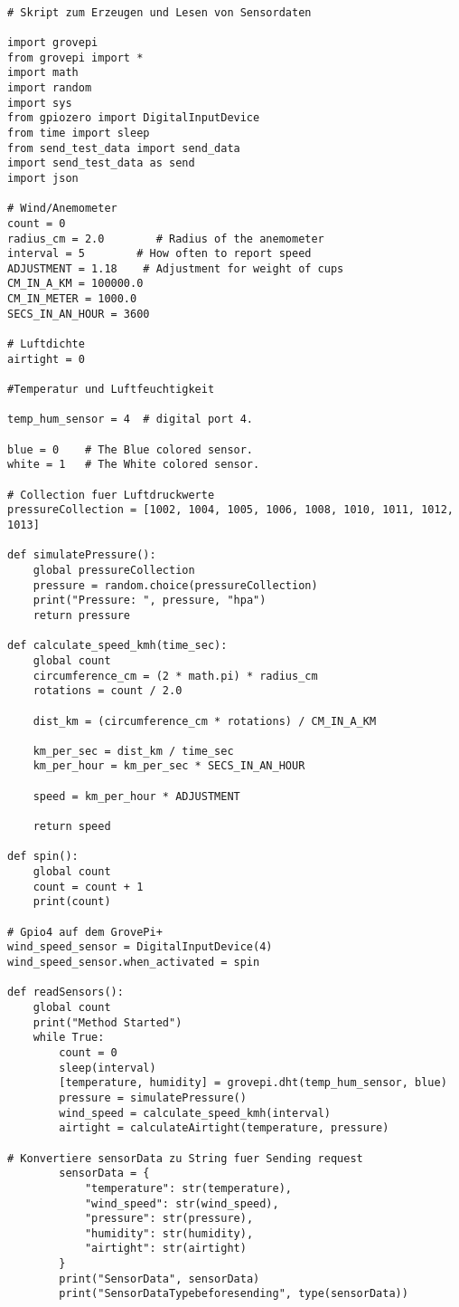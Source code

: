 \begin{lstlisting}

# Skript zum Erzeugen und Lesen von Sensordaten

import grovepi
from grovepi import *
import math
import random
import sys
from gpiozero import DigitalInputDevice
from time import sleep
from send_test_data import send_data
import send_test_data as send
import json

# Wind/Anemometer
count = 0
radius_cm = 2.0        # Radius of the anemometer
interval = 5        # How often to report speed
ADJUSTMENT = 1.18    # Adjustment for weight of cups
CM_IN_A_KM = 100000.0
CM_IN_METER = 1000.0
SECS_IN_AN_HOUR = 3600

# Luftdichte
airtight = 0

#Temperatur und Luftfeuchtigkeit

temp_hum_sensor = 4  # digital port 4.

blue = 0    # The Blue colored sensor.
white = 1   # The White colored sensor.

# Collection fuer Luftdruckwerte
pressureCollection = [1002, 1004, 1005, 1006, 1008, 1010, 1011, 1012, 1013]
 
def simulatePressure():
    global pressureCollection
    pressure = random.choice(pressureCollection)
    print("Pressure: ", pressure, "hpa")
    return pressure

def calculate_speed_kmh(time_sec):
    global count
    circumference_cm = (2 * math.pi) * radius_cm
    rotations = count / 2.0

    dist_km = (circumference_cm * rotations) / CM_IN_A_KM

    km_per_sec = dist_km / time_sec
    km_per_hour = km_per_sec * SECS_IN_AN_HOUR

    speed = km_per_hour * ADJUSTMENT

    return speed

def spin():
    global count
    count = count + 1
    print(count)

# Gpio4 auf dem GrovePi+
wind_speed_sensor = DigitalInputDevice(4)
wind_speed_sensor.when_activated = spin

def readSensors():
    global count
    print("Method Started")
    while True:
        count = 0
        sleep(interval)
        [temperature, humidity] = grovepi.dht(temp_hum_sensor, blue)
        pressure = simulatePressure()
        wind_speed = calculate_speed_kmh(interval)
        airtight = calculateAirtight(temperature, pressure)

# Konvertiere sensorData zu String fuer Sending request
        sensorData = {
            "temperature": str(temperature),
            "wind_speed": str(wind_speed),
            "pressure": str(pressure),
            "humidity": str(humidity),
            "airtight": str(airtight)
        }
        print("SensorData", sensorData)
        print("SensorDataTypebeforesending", type(sensorData))


\end{lstlisting}
